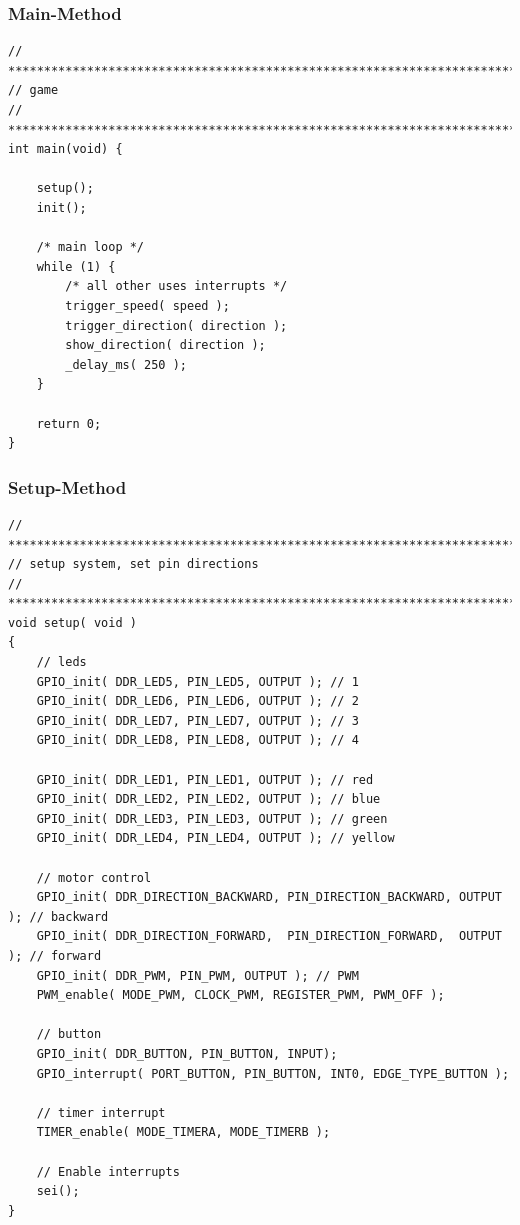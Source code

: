\vspace{0.5cm}

\subsubsection{Main-Method}
\begin{lstlisting}[caption={Main-Method},label=lst:main]
// ****************************************************************************
// game
// ***************************************************************************/
int main(void) {

	setup();
	init();

	/* main loop */
	while (1) {
		/* all other uses interrupts */
		trigger_speed( speed );
		trigger_direction( direction );
		show_direction( direction );
		_delay_ms( 250 );
	}

	return 0;
}
\end{lstlisting}
\vspace{0.5cm}

\subsubsection{Setup-Method}
\begin{lstlisting}[caption={Setup-Method},label=lst:setup]
// ****************************************************************************
// setup system, set pin directions
// ***************************************************************************/
void setup( void )
{
	// leds
	GPIO_init( DDR_LED5, PIN_LED5, OUTPUT ); // 1
	GPIO_init( DDR_LED6, PIN_LED6, OUTPUT ); // 2
	GPIO_init( DDR_LED7, PIN_LED7, OUTPUT ); // 3
	GPIO_init( DDR_LED8, PIN_LED8, OUTPUT ); // 4

	GPIO_init( DDR_LED1, PIN_LED1, OUTPUT ); // red
	GPIO_init( DDR_LED2, PIN_LED2, OUTPUT ); // blue
	GPIO_init( DDR_LED3, PIN_LED3, OUTPUT ); // green
	GPIO_init( DDR_LED4, PIN_LED4, OUTPUT ); // yellow

	// motor control
	GPIO_init( DDR_DIRECTION_BACKWARD, PIN_DIRECTION_BACKWARD, OUTPUT ); // backward
	GPIO_init( DDR_DIRECTION_FORWARD,  PIN_DIRECTION_FORWARD,  OUTPUT ); // forward
	GPIO_init( DDR_PWM, PIN_PWM, OUTPUT ); // PWM
	PWM_enable( MODE_PWM, CLOCK_PWM, REGISTER_PWM, PWM_OFF );

	// button
	GPIO_init( DDR_BUTTON, PIN_BUTTON, INPUT);
	GPIO_interrupt( PORT_BUTTON, PIN_BUTTON, INT0, EDGE_TYPE_BUTTON );

	// timer interrupt
	TIMER_enable( MODE_TIMERA, MODE_TIMERB );

	// Enable interrupts
	sei();
}
\end{lstlisting}
\vspace{0.5cm}

